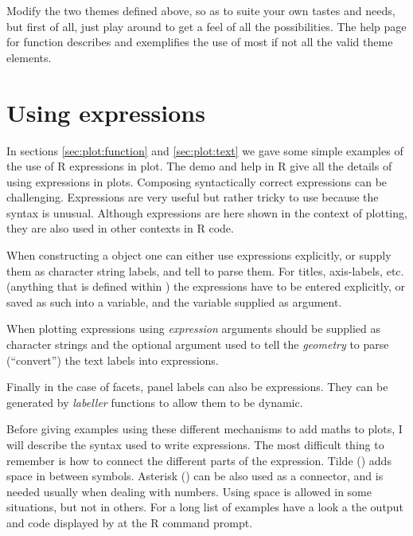 \documentclass[krantz2]{krantz}\usepackage{knitr}%
\begin{document}
\begin{playground}
Modify the two themes defined above, so as to suite your own tastes and needs, but first of all, just play around to get a feel of all the possibilities. The help page for function  describes and exemplifies the use of most if not all the valid theme elements.
\end{playground}

\section[Using plotmath expressions]{Using  expressions}\label{sec:plot:plotmath}
In sections \ref{sec:plot:function} and \ref{sec:plot:text} we gave some simple examples of the use of R expressions in plot. The  demo and help in R give all the details of using expressions in plots. Composing syntactically correct expressions can be challenging. Expressions are very useful but rather tricky to use because the syntax is unusual. Although expressions are here shown in the context of plotting, they are also used in other contexts in R code.%

When constructing a  object one can either use expressions explicitly, or supply them as character string labels, and tell  to parse them. For titles, axis-labels, etc. (anything that is defined within ) the expressions have to be entered explicitly, or saved as such into a variable, and the variable supplied as argument.

When plotting expressions using  \emph{expression} arguments should be supplied as character strings and the optional argument  used to tell the \emph{geometry} to parse (``convert'') the text labels into expressions.

Finally in the case of facets, panel labels can also be expressions. They can be generated by \emph{labeller} functions to allow them to be dynamic.

Before giving examples using these different mechanisms to add maths to plots, I will describe the syntax used to write expressions. The most difficult thing to remember is how to connect the different parts of the expression. Tilde (\code{\textasciitilde}) adds space in between symbols. Asterisk (\code{*}) can be also used as a connector, and is needed usually when dealing with numbers. Using space is allowed in some situations, but not in others. For a long list of examples have a look a the output and code displayed by  at the R command prompt.
\end{document}
